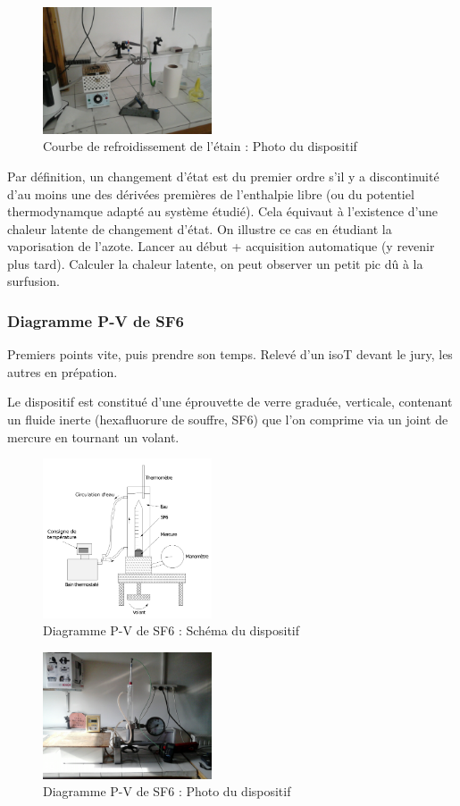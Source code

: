 \documentclass{article}%
\begin{document}
\begin{figure}
	\centerline{\includegraphics[width=5cm]{images-exp/transition_phase_Sn.jpg}}
	\caption{Courbe de refroidissement de l'étain : Photo du dispositif}
\end{figure}
Par définition, un changement d'état est du premier ordre s'il y a discontinuité d'au moins une des dérivées premières de l'enthalpie libre (ou du potentiel thermodynamque adapté au système étudié). Cela équivaut à l'existence d'une chaleur latente de changement d'état. On illustre ce cas en étudiant la vaporisation de l'azote.
Lancer au début + acquisition automatique (y revenir plus tard). Calculer la chaleur latente, on peut observer un petit pic dû à la surfusion.
\subsubsection{Diagramme P-V de SF6}
Premiers points vite, puis prendre son temps. Relevé d'un isoT devant le jury, les autres en prépation.

Le dispositif est constitué d'une éprouvette de verre graduée, verticale, contenant un fluide inerte (hexafluorure de souffre, SF6) que l'on comprime via un joint de mercure en tournant un volant.

\begin{figure}
	\centerline{\includegraphics[width=5cm]{images-exp/IsoT_SF6.png}}
	\caption{Diagramme P-V de SF6 : Schéma du dispositif}
\end{figure}
\begin{figure}
	\centerline{\includegraphics[width=5cm]{images-exp/diagramme_pv_sf6.jpg}}
	\caption{Diagramme P-V de SF6 : Photo du dispositif}
\end{figure}
\end{document}
